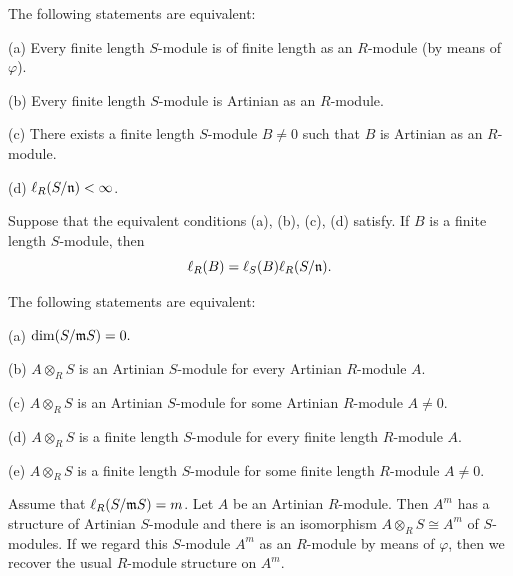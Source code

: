 \documentclass[10pt,a4paper]{amsart}
\begin{document}
\begin{lemma} \label{L:1a} The following statements are equivalent:

(a)  Every  finite length $S$-module is of finite length as an $R$-module (by means of $\varphi$).

(b) Every  finite length $S$-module is Artinian as an $R$-module.

(c) There exists a finite length $S$-module $B\neq 0$  such that $B$ is Artinian as an $R$-module.

(d) $\ell_R (S/\frak n)<\infty$.


Suppose that the equivalent conditions (a), (b), (c), (d) satisfy. If $B$ is a finite length $S$-module, then 
$$\ell_R(B)=\ell_S(B)\ell_R(S/\frak n).$$
\end{lemma}

\begin{proposition} \label{P:1a} The following statements are equivalent:

(a)  $\dim(S/\frak mS)=0.$

(b)   $A\otimes_RS$ is an Artinian $S$-module for every Artinian $R$-module $A$. 

(c) $A\otimes_RS$ is an Artinian $S$-module for some Artinian $R$-module $A\neq 0$.

(d) $A\otimes_RS$ is a finite length $S$-module for every finite length $R$-module $A$.
 
(e) $A\otimes_RS$ is a finite length $S$-module for some finite length $R$-module $A\neq 0$.
\end{proposition}

\begin{theorem} \label{T:2} Assume that $\ell_R(S/\frak mS)=m$. Let $A$ be an Artinian $R$-module. Then  $A^m$ has a structure of Artinian $S$-module and there is an isomorphism $A\otimes_RS\cong A^m$ of $S$-modules. If we regard this $S$-module $A^m$ as an $R$-module by means of $\varphi$, then we recover the usual $R$-module structure on $A^m$.  
\end{theorem}
\end{document}
